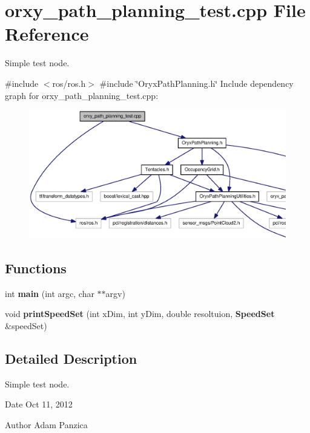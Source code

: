 \section{orxy\-\_\-path\-\_\-planning\-\_\-test.\-cpp \-File \-Reference}
\label{orxy__path__planning__test_8cpp}


\-Simple test node.  


{\ttfamily \#include $<$ros/ros.\-h$>$}\*
{\ttfamily \#include \char`\"{}\-Oryx\-Path\-Planning.\-h\char`\"{}}\*
\-Include dependency graph for orxy\-\_\-path\-\_\-planning\-\_\-test.\-cpp\-:
\nopagebreak
\begin{figure}[H]
\begin{center}
\leavevmode
\includegraphics[width=350pt]{orxy__path__planning__test_8cpp__incl}
\end{center}
\end{figure}
\subsection*{\-Functions}
\begin{DoxyCompactItemize}
\item 
int {\bf main} (int argc, char $\ast$$\ast$argv)
\item 
void {\bf print\-Speed\-Set} (int x\-Dim, int y\-Dim, double resoltuion, {\bf \-Speed\-Set} \&speed\-Set)
\end{DoxyCompactItemize}


\subsection{\-Detailed \-Description}
\-Simple test node. \begin{DoxyDate}{\-Date}
\-Oct 11, 2012 
\end{DoxyDate}
\begin{DoxyAuthor}{\-Author}
\-Adam \-Panzica 
\end{DoxyAuthor}


